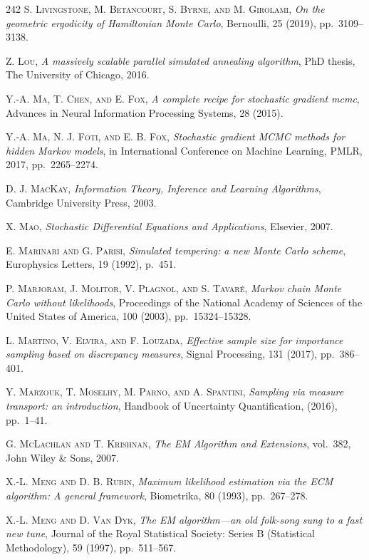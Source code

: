 \begin{thebibliography}{242}
\textsc{S. Livingstone, M. Betancourt, S. Byrne, and M. Girolami},
\textit{On the geometric ergodicity of Hamiltonian Monte Carlo},
Bernoulli, 25 (2019), pp.\ 3109--3138.

\textsc{Z. Lou},
\textit{A massively scalable parallel simulated annealing algorithm},
PhD thesis, The University of Chicago, 2016.

\textsc{Y.-A. Ma, T. Chen, and E. Fox},
\textit{A complete recipe for stochastic gradient mcmc},
Advances in Neural Information Processing Systems, 28 (2015).

\textsc{Y.-A. Ma, N. J. Foti, and E. B. Fox},
\textit{Stochastic gradient MCMC methods for hidden Markov models},
in International Conference on Machine Learning, PMLR, 2017, pp.\ 2265--2274.

\textsc{D. J. MacKay},
\textit{Information Theory, Inference and Learning Algorithms},
Cambridge University Press, 2003.

\textsc{X. Mao},
\textit{Stochastic Differential Equations and Applications},
Elsevier, 2007.

\textsc{E. Marinari and G. Parisi},
\textit{Simulated tempering: a new Monte Carlo scheme},
Europhysics Letters, 19 (1992), p.\ 451.

\textsc{P. Marjoram, J. Molitor, V. Plagnol, and S. Tavar\'e},
\textit{Markov chain Monte Carlo without likelihoods},
Proceedings of the National Academy of Sciences of the United States of America, 100 (2003), pp.\ 15324--15328.

\textsc{L. Martino, V. Elvira, and F. Louzada},
\textit{Effective sample size for importance sampling based on discrepancy measures},
Signal Processing, 131 (2017), pp.\ 386--401.

\textsc{Y. Marzouk, T. Moselhy, M. Parno, and A. Spantini},
\textit{Sampling via measure transport: an introduction},
Handbook of Uncertainty Quantification, (2016), pp.\ 1--41.

\textsc{G. McLachlan and T. Krishnan},
\textit{The EM Algorithm and Extensions},
vol.\ 382, John Wiley \& Sons, 2007.

\textsc{X.-L. Meng and D. B. Rubin},
\textit{Maximum likelihood estimation via the ECM algorithm: A general framework},
Biometrika, 80 (1993), pp.\ 267--278.

\textsc{X.-L. Meng and D. Van Dyk},
\textit{The EM algorithm---an old folk-song sung to a fast new tune},
Journal of the Royal Statistical Society: Series B (Statistical Methodology), 59 (1997), pp.\ 511--567.


\end{thebibliography}
